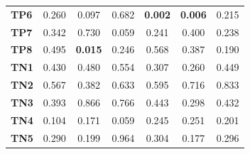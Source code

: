 \begin{table}
\begin{tabular}{lccc|ccc}
        \textbf{TP6}  & 0.260                                   & 0.097                                             & 0.682                                  & \cellcolor[HTML]{EFEFEF}\textbf{0.002}   & \cellcolor[HTML]{EFEFEF}\textbf{0.006} & 0.215                                  \\
        \textbf{TP7}  & 0.342                                   & 0.730                                             & 0.059                                  & 0.241                                    & 0.400                                  & 0.238                                  \\
        \textbf{TP8}  & 0.495                                   & \cellcolor[HTML]{EFEFEF}\textbf{0.015}            & 0.246                                  & 0.568                                    & 0.387                                  & 0.190                                  \\
        \textbf{TN1}  & 0.430                                   & 0.480                                             & 0.554                                  & 0.307                                    & 0.260                                  & 0.449                                  \\
        \textbf{TN2}  & 0.567                                   & 0.382                                             & 0.633                                  & 0.595                                    & 0.716                                  & 0.833                                  \\
        \textbf{TN3}  & 0.393                                   & 0.866                                             & 0.766                                  & 0.443                                    & 0.298                                  & 0.432                                  \\
        \textbf{TN4}  & 0.104                                   & 0.171                                             & 0.059                                  & 0.245                                    & 0.251                                  & 0.201                                  \\
        \textbf{TN5}  & 0.290                                   & 0.199                                             & 0.964                                  & 0.304                                    & 0.177                                  & 0.296                                  \\

\end{tabular}
\end{table}
